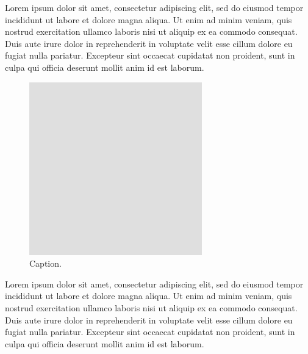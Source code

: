 \documentclass[a4paper, 11pt]{article}
\begin{document}

Lorem ipsum dolor sit amet, consectetur adipiscing elit, sed do eiusmod tempor
incididunt ut labore et dolore magna aliqua. Ut enim ad minim veniam, quis
nostrud exercitation ullamco laboris nisi ut aliquip ex ea commodo consequat.
Duis aute irure dolor in reprehenderit in voluptate velit esse cillum dolore eu
fugiat nulla pariatur. Excepteur sint occaecat cupidatat non proident, sunt in
culpa qui officia deserunt mollit anim id est laborum.

\begin{figure}[htbp] %
\centering
\includegraphics[width=0.45\linewidth]{PlaceholderImage.png}
\caption{
    Caption.
}
\label{fig:Figure}
\end{figure} %

Lorem ipsum dolor sit amet, consectetur adipiscing elit, sed do eiusmod tempor
incididunt ut labore et dolore magna aliqua. Ut enim ad minim veniam, quis
nostrud exercitation ullamco laboris nisi ut aliquip ex ea commodo consequat.
Duis aute irure dolor in reprehenderit in voluptate velit esse cillum dolore eu
fugiat nulla pariatur. Excepteur sint occaecat cupidatat non proident, sunt in
culpa qui officia deserunt mollit anim id est laborum.


\newrefcontext[sorting=nyt]
\printbibliography
\newrefcontext[sorting=ynt]

\end{document}
